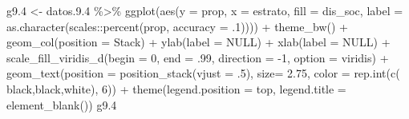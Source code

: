 \documentclass[
  12pt,
]{book}
\newenvironment{Shaded}{\begin{snugshade}}{\end{snugshade}}
\newcommand{\AttributeTok}[1]{\textcolor[rgb]{0.77,0.63,0.00}{#1}}
\newcommand{\ConstantTok}[1]{\textcolor[rgb]{0.00,0.00,0.00}{#1}}
\newcommand{\DecValTok}[1]{\textcolor[rgb]{0.00,0.00,0.81}{#1}}
\newcommand{\FloatTok}[1]{\textcolor[rgb]{0.00,0.00,0.81}{#1}}
\newcommand{\FunctionTok}[1]{\textcolor[rgb]{0.00,0.00,0.00}{#1}}
\newcommand{\NormalTok}[1]{#1}
\newcommand{\OtherTok}[1]{\textcolor[rgb]{0.56,0.35,0.01}{#1}}
\newcommand{\SpecialCharTok}[1]{\textcolor[rgb]{0.00,0.00,0.00}{#1}}
\newcommand{\StringTok}[1]{\textcolor[rgb]{0.31,0.60,0.02}{#1}}
\begin{document}
\begin{Shaded}
\begin{Highlighting}[]
\NormalTok{g9}\FloatTok{.4} \OtherTok{\textless{}{-}}\NormalTok{ datos.}\FloatTok{9.4} \SpecialCharTok{\%\textgreater{}\%}
  \FunctionTok{ggplot}\NormalTok{(}\FunctionTok{aes}\NormalTok{(}\AttributeTok{y =}\NormalTok{ prop, }\AttributeTok{x =}\NormalTok{ estrato, }\AttributeTok{fill =}\NormalTok{ dis\_soc, }
             \AttributeTok{label =} \FunctionTok{as.character}\NormalTok{(scales}\SpecialCharTok{::}\FunctionTok{percent}\NormalTok{(prop, }\AttributeTok{accuracy =}\NormalTok{ .}\DecValTok{1}\NormalTok{)))) }\SpecialCharTok{+} 
  \FunctionTok{theme\_bw}\NormalTok{() }\SpecialCharTok{+} 
  \FunctionTok{geom\_col}\NormalTok{(}\AttributeTok{position =} \StringTok{\textquotesingle{}Stack\textquotesingle{}}\NormalTok{) }\SpecialCharTok{+}
  \FunctionTok{ylab}\NormalTok{(}\AttributeTok{label =} \ConstantTok{NULL}\NormalTok{) }\SpecialCharTok{+}
  \FunctionTok{xlab}\NormalTok{(}\AttributeTok{label =} \ConstantTok{NULL}\NormalTok{) }\SpecialCharTok{+}
  \FunctionTok{scale\_fill\_viridis\_d}\NormalTok{(}\AttributeTok{begin =} \DecValTok{0}\NormalTok{, }\AttributeTok{end =}\NormalTok{ .}\DecValTok{99}\NormalTok{, }\AttributeTok{direction =} \SpecialCharTok{{-}}\DecValTok{1}\NormalTok{, }\AttributeTok{option =} \StringTok{\textquotesingle{}viridis\textquotesingle{}}\NormalTok{) }\SpecialCharTok{+}
  \FunctionTok{geom\_text}\NormalTok{(}\AttributeTok{position =} \FunctionTok{position\_stack}\NormalTok{(}\AttributeTok{vjust =}\NormalTok{ .}\DecValTok{5}\NormalTok{),}
            \AttributeTok{size=} \FloatTok{2.75}\NormalTok{, }\AttributeTok{color =} \FunctionTok{rep.int}\NormalTok{(}\FunctionTok{c}\NormalTok{( }\StringTok{\textquotesingle{}black\textquotesingle{}}\NormalTok{,}\StringTok{\textquotesingle{}black\textquotesingle{}}\NormalTok{,}\StringTok{\textquotesingle{}white\textquotesingle{}}\NormalTok{), }\DecValTok{6}\NormalTok{)) }\SpecialCharTok{+} 
  \FunctionTok{theme}\NormalTok{(}\AttributeTok{legend.position =} \StringTok{\textquotesingle{}top\textquotesingle{}}\NormalTok{,}
        \AttributeTok{legend.title =} \FunctionTok{element\_blank}\NormalTok{())}
\NormalTok{g9}\FloatTok{.4}
\end{Highlighting}
\end{Shaded}
\end{document}
